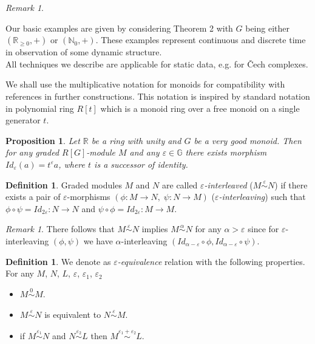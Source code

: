 \documentclass[a4paper, 12pt]{article}
\newcounter{stmcounter}[section]
\numberwithin{equation}{section}
\newtheorem{proposition}[stmcounter]{Proposition}
\theoremstyle{definition}
\newtheorem{definition}[stmcounter]{Definition}
\theoremstyle{remark}
\newtheorem{remark}[stmcounter]{Remark}
\newcommand{\define}[1]{{\textit{#1}}}
\renewcommand{\geq}{\geqslant}
\begin{document}
\begin{remark} ~ \par
  Our basic examples are given by considering Theorem 2 with $G$ being either $(\mathbb{R}_{\geq 0},+)$ or $(\mathbb{N}_0,+)$. These examples represent continuous and discrete time in observation of some dynamic structure.\\

  All techniques we describe are applicable for static data, e.g. for Čech complexes.\\
\end{remark}

We shall use the multiplicative notation for monoids for compatibility with references in further constructions. This notation is inspired by standard notation in polynomial ring $R[t]$ which is a monoid ring over a free monoid on a single generator $t$.

\begin{proposition}
  Let $\mathbb{R}$ be a ring with unity and $G$ be a very good monoid. Then for any graded $R[G]$-module $M$ and any $\varepsilon \in \mathbb{G}$ there exists morphism $Id_{\varepsilon}(a) = t^{\varepsilon}a$, where $t$ is a successor of identity.
\end{proposition}

\begin{definition}
  Graded modules $M$ and $N$ are called \define{$\varepsilon$-interleaved} ($M \stackrel{\varepsilon}{\sim} N$) if there exists a pair of $\varepsilon$-morphisms $(\phi : M \to N,\;\psi : N \to M)$ (\define{$\varepsilon$-interleaving}) such that $\phi \circ \psi = Id_{2\varepsilon} : N \to N$ and $\psi \circ \phi = Id_{2\varepsilon} : M \to M$.\\
\end{definition}

\begin{remark}
  There follows that $M \stackrel{\varepsilon}{\sim} N$ implies $M \stackrel{\alpha}{\sim} N$ for any $\alpha > \varepsilon$ since for $\varepsilon$-interleaving $(\phi, \psi)$ we have $\alpha$-interleaving $(Id_{\alpha - \varepsilon} \circ \phi, Id_{\alpha - \varepsilon} \circ \psi)$.
\end{remark}

\begin{definition}
  We denote as \define{$\varepsilon$-equivalence} relation with the following properties.\\
  For any $M$, $N$, $L$, $\varepsilon$, $\varepsilon_1$, $\varepsilon_2$
  \begin{itemize}
    \item $M \stackrel{0}{\sim} M$.
    \item $M \stackrel{\varepsilon}{\sim} N$ is equivalent to $N \stackrel{\varepsilon}{\sim} M$.
    \item if $M \stackrel{\varepsilon_1}{\sim} N$ and $N \stackrel{\varepsilon_2}{\sim} L$ then $M \stackrel{\varepsilon_1 + \varepsilon_2}{\sim} L$.
  \end{itemize}
\end{definition}
\end{document}
